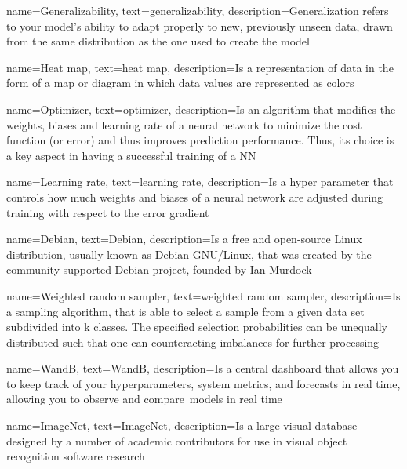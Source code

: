 {
        name=Generalizability,
        text=generalizability,
        description={Generalization refers to your model's ability to adapt properly to new, previously unseen data, drawn from the same distribution as the one used to create the model \cite{GoogleDevelopers.2022}}
}

{
        name=Heat map,
        text=heat map,
        description={Is a representation of data in the form of a map or diagram in which data values are represented as colors \cite{OxfordUniversityPress.2022}}
}

{
        name=Optimizer,
        text=optimizer,
        description={Is an algorithm that modifies the weights, biases and learning rate of a neural network to minimize the cost function (or error) and thus improves prediction performance. Thus, its choice is a key aspect in having a successful training of a NN}
}

{
        name=Learning rate,
        text=learning rate,
        description={Is a hyper parameter that controls how much weights and biases of a neural network are adjusted during training with respect to the error gradient}
}

{
        name=Debian,
        text=Debian,
        description={Is a free and open-source Linux distribution, usually known as Debian GNU/Linux, that was created by the community-supported Debian project, founded by Ian Murdock}
}

{
        name=Weighted random sampler,
        text=weighted random sampler,
        description={Is a sampling algorithm, that is able to select a sample from a given data set subdivided into k classes. The specified selection probabilities can be unequally distributed such that one can counteracting imbalances for further processing}
}

{
        name=WandB,
        text=WandB,
        description={Is a central dashboard that allows you to keep track of your hyperparameters, system metrics, and forecasts in real time, allowing you to observe and compare models in real time}
}

{
        name=ImageNet,
        text=ImageNet,
        description={Is a large visual database designed by a number of academic contributors for use in visual object recognition software research}
}

